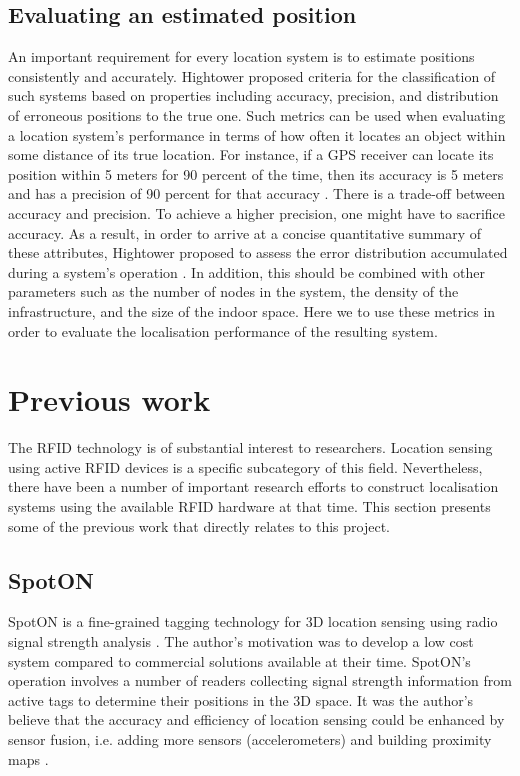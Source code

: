 \subsection{Evaluating an estimated position}

An important requirement for every location system is to estimate positions consistently and accurately. Hightower \cite{Hightower2001c} proposed criteria for the classification of such systems based on properties including accuracy, precision, and distribution of erroneous positions to the true one. Such metrics can be used when evaluating a location system's performance in terms of how often it locates an object within some distance of its true location. For instance, if a GPS receiver can locate its position within 5 meters for 90 percent of the time, then its accuracy is 5 meters and has a precision of 90 percent for that accuracy \cite{Hightower2001}. There is a trade-off between accuracy and precision. To achieve a higher precision, one might have to sacrifice accuracy. As a result, in order to arrive at a concise quantitative summary of these attributes, Hightower proposed to assess the error distribution accumulated during a system's operation \cite{Hightower2001}. In addition, this should be combined with other parameters such as the number of nodes in the system, the density of the infrastructure, and the size of the indoor space. Here we to use these metrics in order to evaluate the localisation performance of the resulting system.

\section{Previous work}

The RFID technology is of substantial interest to researchers. Location sensing using active RFID devices is a specific subcategory of this field. Nevertheless, there have been a number of important research efforts to construct localisation systems using the available RFID hardware at that time. This section presents some of the previous work that directly relates to this project.


\subsection{SpotON}

SpotON is a fine-grained tagging technology for 3D location sensing using radio signal strength analysis \cite{Hightower2000}. The author's motivation was to develop a low cost system compared to commercial solutions available at their time. SpotON's operation involves a number of readers collecting signal strength information from active tags to determine their positions in the 3D space. It was the author's believe that the accuracy and efficiency of location sensing could be enhanced by sensor fusion, i.e. adding more sensors (accelerometers) and building proximity maps \cite{Hightower2000}.

